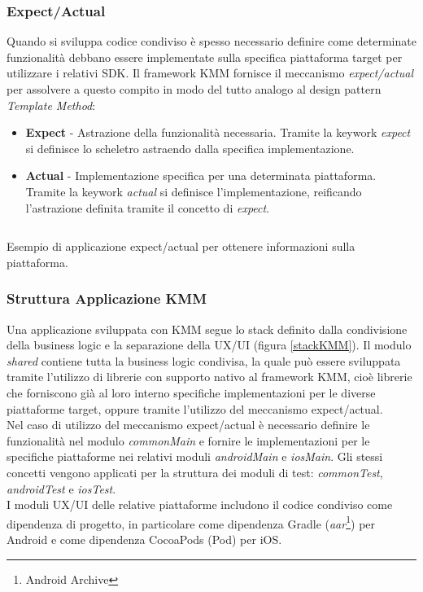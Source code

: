 \subsubsection{Expect/Actual}
Quando si sviluppa codice condiviso è spesso necessario definire come determinate funzionalità debbano essere implementate sulla specifica piattaforma target per utilizzare i relativi SDK. Il framework KMM fornisce il meccanismo \textit{expect/actual} per assolvere a questo compito in modo del tutto analogo al design pattern \textit{Template Method}:
\begin{itemize}
    \item \textbf{Expect} - Astrazione della funzionalità necessaria. Tramite la keywork \textit{expect} si definisce lo scheletro astraendo dalla specifica implementazione.
    \item \textbf{Actual} - Implementazione specifica per una determinata piattaforma. Tramite la keywork \textit{actual} si definisce l'implementazione, reificando l'astrazione definita tramite il concetto di \textit{expect}.
\end{itemize}

\begin{listing}[H]
\inputminted{kotlin}{code/3-expectactual}
\caption{Esempio di applicazione expect/actual per ottenere informazioni sulla piattaforma.}
\end{listing}

\subsubsection{Struttura Applicazione KMM}
Una applicazione sviluppata con KMM segue lo stack definito dalla condivisione della business logic e la separazione della UX/UI (figura \ref{stackKMM}). Il modulo \textit{shared} contiene tutta la business logic condivisa, la quale può essere sviluppata tramite l'utilizzo di librerie con supporto nativo al framework KMM, cioè librerie che forniscono già al loro interno specifiche implementazioni per le diverse piattaforme target, oppure tramite l'utilizzo del meccanismo expect/actual.\\
Nel caso di utilizzo del meccanismo expect/actual è necessario definire le funzionalità nel modulo \textit{commonMain} e fornire le implementazioni per le specifiche piattaforme nei relativi moduli \textit{androidMain} e \textit{iosMain}. Gli stessi concetti vengono applicati per la struttura dei moduli di test: \textit{commonTest}, \textit{androidTest} e \textit{iosTest}.\\
I moduli UX/UI delle relative piattaforme includono il codice condiviso come dipendenza di progetto, in particolare come dipendenza Gradle (\textit{aar}\footnote{Android Archive}) per Android e come dipendenza CocoaPods (Pod) per iOS.

